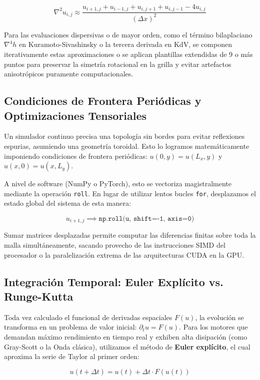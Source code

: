 \documentclass[12pt, openany]{book}
\begin{document}
\begin{equation}
\nabla^2 u_{i,j} \approx \frac{u_{i+1,j} + u_{i-1,j} + u_{i,j+1} + u_{i,j-1} - 4u_{i,j}}{(\Delta x)^2}
\end{equation}

Para las evaluaciones dispersivas o de mayor orden, como el término bilaplaciano $\nabla^4 h$ en Kuramoto-Sivashinsky o la tercera derivada en KdV, se componen iterativamente estas aproximaciones o se aplican plantillas extendidas de 9 o más puntos para preservar la simetría rotacional en la grilla y evitar artefactos anisotrópicos puramente computacionales.

\subsection{Condiciones de Frontera Periódicas y Optimizaciones Tensoriales}
Un simulador continuo precisa una topología sin bordes para evitar reflexiones espurias, asumiendo una geometría toroidal. Esto lo logramos matemáticamente imponiendo condiciones de frontera periódicas: $u(0, y) = u(L_x, y)$ y $u(x, 0) = u(x, L_y)$.

A nivel de software (NumPy o PyTorch), esto se vectoriza magistralmente mediante la operación \texttt{roll}. En lugar de utilizar lentos bucles \texttt{for}, desplazamos el estado global del sistema de esta manera:

\begin{equation}
u_{i+1,j} \implies \texttt{np.roll(u, shift=-1, axis=0)}
\end{equation}

Sumar matrices desplazadas permite computar las diferencias finitas sobre toda la malla simultáneamente, sacando provecho de las instrucciones SIMD del procesador o la paralelización extrema de las arquitecturas CUDA en la GPU.

\subsection{Integración Temporal: Euler Explícito vs. Runge-Kutta}
Toda vez calculado el funcional de derivadas espaciales $F(u)$, la evolución se transforma en un problema de valor inicial: $\partial_t u = F(u)$. Para los motores que demandan máximo rendimiento en tiempo real y exhiben alta disipación (como Gray-Scott o la Onda clásica), utilizamos el método de \textbf{Euler explícito}, el cual aproxima la serie de Taylor al primer orden:

\begin{equation}
u(t + \Delta t) = u(t) + \Delta t \cdot F(u(t))
\end{equation}
\end{document}
